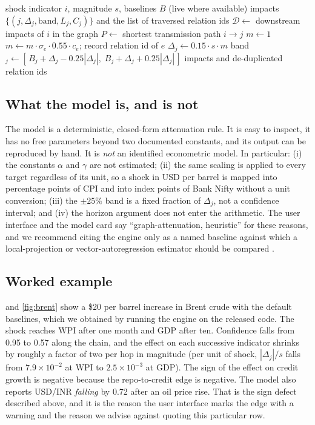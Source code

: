 \documentclass[conference]{IEEEtran}
\begin{document}
\begin{algorithm}[t]
\caption{Graph-attenuation scenario propagation}
\label{alg:scenario}
\begin{algorithmic}[1]
\Require shock indicator $i$, magnitude $s$, baselines $B$ (live where available)
\Ensure impacts $\{(j,\Delta_j,\text{band},L_j,C_j)\}$ and the list of traversed relation ids
\State $\mathcal{D}\gets$ downstream impacts of $i$ in the graph
  \State $P\gets$ shortest transmission path $i\to j$
  \State $m\gets 1$
     \State $m\gets m\cdot \sigma_e\cdot 0.55\cdot c_e$; record relation id of $e$
  \EndFor
  \State $\Delta_j\gets 0.15\cdot s\cdot m$
  \State band$_j\gets [\,B_j+\Delta_j-0.25|\Delta_j|,\; B_j+\Delta_j+0.25|\Delta_j|\,]$
\EndFor
\State \Return impacts and de-duplicated relation ids
\end{algorithmic}
\end{algorithm}

\subsection{What the model is, and is not}
The model is a deterministic, closed-form attenuation rule. It is easy to inspect, it has no free parameters beyond two documented constants, and its output can be reproduced by hand. It is \emph{not} an identified econometric model. In particular: (i) the constants $\alpha$ and $\gamma$ are not estimated; (ii) the same scaling is applied to every target regardless of its unit, so a shock in USD per barrel is mapped into percentage points of CPI and into index points of Bank Nifty without a unit conversion; (iii) the $\pm25\%$ band is a fixed fraction of $\Delta_j$, not a confidence interval; and (iv) the horizon argument does not enter the arithmetic. The user interface and the model card say ``graph-attenuation, heuristic'' for these reasons, and we recommend citing the engine only as a named baseline against which a local-projection or vector-autoregression estimator should be compared \cite{jorda2005lp,sims1980macro}.

\subsection{Worked example}
 and \cref{fig:brent} show a \$20 per barrel increase in Brent crude with the default baselines, which we obtained by running the engine on the released code. The shock reaches WPI after one month and GDP after ten. Confidence falls from 0.95 to 0.57 along the chain, and the effect on each successive indicator shrinks by roughly a factor of two per hop in magnitude (per unit of shock, $|\Delta_j|/s$ falls from $7.9\times10^{-2}$ at WPI to $2.5\times10^{-3}$ at GDP). The sign of the effect on credit growth is negative because the repo-to-credit edge is negative. The model also reports USD/INR \emph{falling} by 0.72 after an oil price rise. That is the sign defect described above, and it is the reason the user interface marks the edge with a warning and the reason we advise against quoting this particular row.
\end{document}
